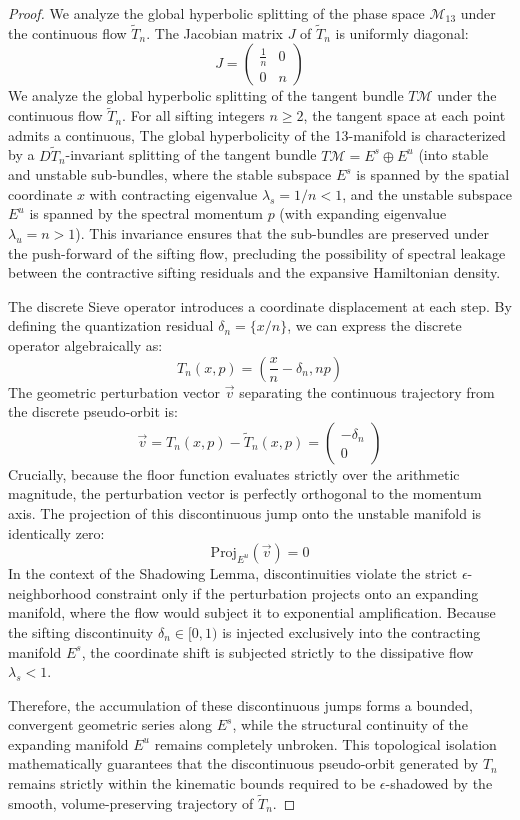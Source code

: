 \documentclass[sn-mathphys-num, pdflatex]{sn-jnl}
\begin{document}
\begin{proof}
We analyze the global hyperbolic splitting of the phase space $\mathcal{M}_{13}$ under the continuous flow $\tilde{T}_n$. The Jacobian matrix $J$ of $\tilde{T}_n$ is uniformly diagonal:
$$ J = \begin{pmatrix} \frac{1}{n} & 0 \\ 0 & n \end{pmatrix} $$
We analyze the global hyperbolic splitting of the tangent bundle $T\mathcal{M}$ under the continuous flow $\tilde{T}_n$. For all sifting integers $n \ge 2$, the tangent space at each point admits a continuous, The global hyperbolicity of the 13-manifold is characterized by a $D\tilde{T}_n$-invariant splitting of the tangent bundle $T\mathcal{M} = E^s \oplus E^u$ (into stable and unstable sub-bundles, where the stable subspace $E^s$ is spanned by the spatial coordinate $x$ with contracting eigenvalue $\lambda_s = 1/n < 1$, and the unstable subspace $E^u$ is spanned by the spectral momentum $p$ (with expanding eigenvalue $\lambda_u = n > 1$). This invariance ensures that the sub-bundles are preserved under the push-forward of the sifting flow, precluding the possibility of spectral leakage between the contractive sifting residuals and the expansive Hamiltonian density.

The discrete Sieve operator introduces a coordinate displacement at each step. By defining the quantization residual $\delta_n = \{x/n\}$, we can express the discrete operator algebraically as:
$$ T_n(x,p) = \left( \frac{x}{n} - \delta_n, np \right) $$
The geometric perturbation vector $\vec{v}$ separating the continuous trajectory from the discrete pseudo-orbit is:
$$ \vec{v} = T_n(x,p) - \tilde{T}_n(x,p) = \begin{pmatrix} -\delta_n \\ 0 \end{pmatrix} $$
Crucially, because the floor function evaluates strictly over the arithmetic magnitude, the perturbation vector is perfectly orthogonal to the momentum axis. The projection of this discontinuous jump onto the unstable manifold is identically zero:
$$ \text{Proj}_{E^u}(\vec{v}) = 0 $$
In the context of the Shadowing Lemma, discontinuities violate the strict $\epsilon$-neighborhood constraint only if the perturbation projects onto an expanding manifold, where the flow would subject it to exponential amplification. Because the sifting discontinuity $\delta_n \in [0,1)$ is injected exclusively into the contracting manifold $E^s$, the coordinate shift is subjected strictly to the dissipative flow $\lambda_s < 1$. 

Therefore, the accumulation of these discontinuous jumps forms a bounded, convergent geometric series along $E^s$, while the structural continuity of the expanding manifold $E^u$ remains completely unbroken. This topological isolation mathematically guarantees that the discontinuous pseudo-orbit generated by $T_n$ remains strictly within the kinematic bounds required to be $\epsilon$-shadowed by the smooth, volume-preserving trajectory of $\tilde{T}_n$.
\end{proof}
\end{document}
